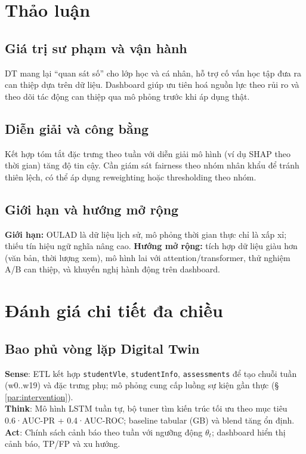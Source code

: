 \documentclass[12pt,a4paper]{article}
\newcommand{\dataset}{OULAD}
\begin{document}
\section{Thảo luận}
\subsection{Giá trị sư phạm và vận hành}
DT mang lại ``quan sát số'' cho lớp học và cá nhân, hỗ trợ cố vấn học tập đưa ra can thiệp dựa trên dữ liệu. Dashboard giúp ưu tiên hoá nguồn lực theo rủi ro và theo dõi tác động can thiệp qua mô phỏng trước khi áp dụng thật.

\subsection{Diễn giải và công bằng}
Kết hợp tóm tắt đặc trưng theo tuần với diễn giải mô hình (ví dụ SHAP theo thời gian) tăng độ tin cậy. Cần giám sát fairness theo nhóm nhân khẩu để tránh thiên lệch, có thể áp dụng reweighting hoặc thresholding theo nhóm.

\subsection{Giới hạn và hướng mở rộng}
\textbf{Giới hạn:} \dataset{} là dữ liệu lịch sử, mô phỏng thời gian thực chỉ là xấp xỉ; thiếu tín hiệu ngữ nghĩa nâng cao. \textbf{Hướng mở rộng:} tích hợp dữ liệu giàu hơn (văn bản, thời lượng xem), mô hình lai với attention/transformer, thử nghiệm A/B can thiệp, và khuyến nghị hành động trên dashboard.

\section{Đánh giá chi tiết đa chiều}\label{sec:danhgia}
\subsection{Bao phủ vòng lặp Digital Twin}
\textbf{Sense}: ETL kết hợp \texttt{studentVle}, \texttt{studentInfo}, \texttt{assessments} để tạo chuỗi tuần (w0..w19) và đặc trưng phụ; mô phỏng cung cấp luồng sự kiện gần thực (\S\,\ref{par:intervention}).\\
\textbf{Think}: Mô hình LSTM tuần tự, bộ tuner tìm kiến trúc tối ưu theo mục tiêu 0.6·AUC-PR + 0.4·AUC-ROC; baseline tabular (GB) và blend tăng ổn định.\\
\textbf{Act}: Chính sách cảnh báo theo tuần với ngưỡng động $\theta_t$; dashboard hiển thị cảnh báo, TP/FP và xu hướng.
\end{document}

